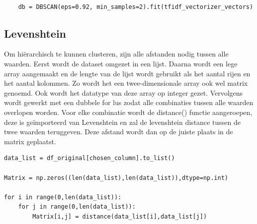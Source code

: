 \begin{lstlisting}

    db = DBSCAN(eps=0.92, min_samples=2).fit(tfidf_vectorizer_vectors)

\end{lstlisting}



\subsection{Levenshtein}
Om hiërarchisch te kunnen clusteren, zijn alle afstanden nodig tussen alle waarden. Eerst wordt de dataset omgezet in een lijst. Daarna wordt een lege array aangemaakt en de lengte van de lijst wordt gebruikt als het aantal rijen en het aantal kolommen. Zo wordt het een twee-dimensionale array ook wel matrix genoemd. Ook wordt het datatype van deze array op integer gezet. Vervolgens wordt gewerkt met een dubbele for lus zodat alle combinaties tussen alle waarden overlopen worden. Voor elke combinatie wordt de distance() functie aangeroepen, deze is geïmporteerd van Levenshtein en zal de levenshtein distance tussen de twee waarden teruggeven. Deze afstand wordt dan op de juiste plaats in de matrix geplaatst.
\\\indent

\begin{lstlisting}
data_list = df_original[chosen_column].to_list()

Matrix = np.zeros((len(data_list),len(data_list)),dtype=np.int)

for i in range(0,len(data_list)):
    for j in range(0,len(data_list)):
        Matrix[i,j] = distance(data_list[i],data_list[j])

\end{lstlisting}


